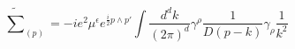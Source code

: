 \begin{equation}
\widetilde{\sum}_{(p)}=-ie^{2}\mu^{\epsilon}e^{\frac{i}{2}p\wedge
p'}\int\frac{d^{d}k}{(2\pi)^{d}}\gamma^{\rho}\frac{1}{D(p-k)}\gamma_{\rho}\frac{1}{k^{2}}
\end{equation}

